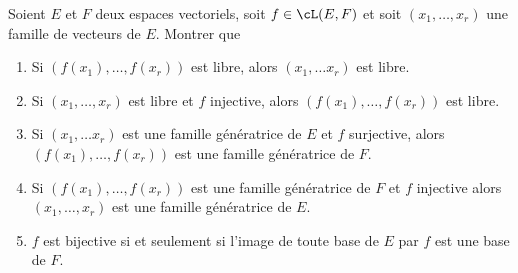 \documentclass[a4paper, 11pt,reqno]{article}
\begin{document}
\begin{exercice}  \;
	Soient $E$ et $F$ deux espaces vectoriels, soit $f\in\cL(E,F)$ et soit $(x_1,\dots, x_r)$ une famille de vecteurs de $E$. Montrer que
	\begin{enumerate}
		\item Si $\left( f(x_1),\dots, f(x_r)   \right)$ est libre, alors $(x_1,\dots x_r)$ est libre.
		\item Si $(x_1,\dots, x_r)$ est libre et $f$ injective, alors $\left( f(x_1),\dots, f(x_r)      \right)$ est libre.
		\item Si $(x_1,\dots x_r)$ est une famille g\'en\'eratrice de $E$ et $f$ surjective, alors $\left( f(x_1),\dots, f(x_r)   \right)$ est une famille g\'en\'eratrice de $F$.
		\item Si $\left( f(x_1),\dots, f(x_r)   \right)$ est une famille g\'en\'eratrice de $F$ et $f$ injective alors $(x_1,\dots, x_r)$ est une famille g\'en\'eratrice de $E$.
		\item $f$ est bijective si et seulement si l'image de toute base de $E$ par $f$ est une base de $F$.
	\end{enumerate}
\end{exercice}
\end{document}

